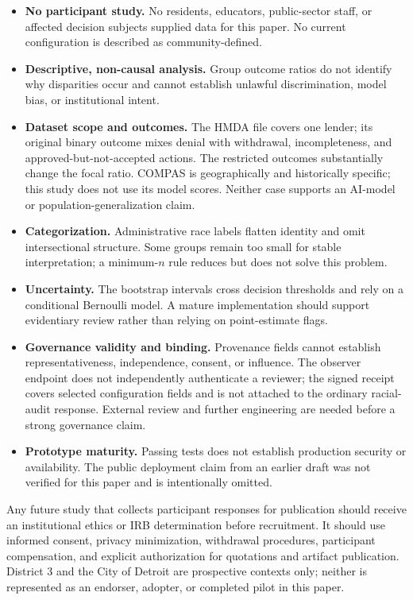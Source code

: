 \documentclass[10pt]{article}
\begin{document}
\begin{itemize}
  \item \textbf{No participant study.} No residents, educators, public-sector
  staff, or affected decision subjects supplied data for this paper. No current
  configuration is described as community-defined.
  \item \textbf{Descriptive, non-causal analysis.} Group outcome ratios do not
  identify why disparities occur and cannot establish unlawful discrimination,
  model bias, or institutional intent.
  \item \textbf{Dataset scope and outcomes.} The HMDA file covers one lender;
  its original binary outcome mixes denial with withdrawal, incompleteness,
  and approved-but-not-accepted actions. The restricted outcomes substantially
  change the focal ratio. COMPAS is geographically and historically specific;
  this study does not use its model scores. Neither case supports an AI-model
  or population-generalization claim.
  \item \textbf{Categorization.} Administrative race labels flatten identity
  and omit intersectional structure. Some groups remain too small for stable
  interpretation; a minimum-$n$ rule reduces but does not solve this problem.
  \item \textbf{Uncertainty.} The bootstrap intervals cross decision
  thresholds and rely on a conditional Bernoulli model. A mature implementation
  should support evidentiary review rather than relying on point-estimate flags.
  \item \textbf{Governance validity and binding.} Provenance fields cannot
  establish representativeness, independence, consent, or influence. The
  observer endpoint does not independently authenticate a reviewer; the signed
  receipt covers selected configuration fields and is not attached to the
  ordinary racial-audit response. External review and further engineering are
  needed before a strong governance claim.
  \item \textbf{Prototype maturity.} Passing tests does not establish
  production security or availability. The public deployment claim from an
  earlier draft was not verified for this paper and is intentionally omitted.
\end{itemize}

Any future study that collects participant responses for publication should
receive an institutional ethics or IRB determination before recruitment. It
should use informed consent, privacy minimization, withdrawal procedures,
participant compensation, and explicit authorization for quotations and
artifact publication. District 3 and the City of Detroit are prospective
contexts only; neither is represented as an endorser, adopter, or completed
pilot in this paper.
\end{document}
